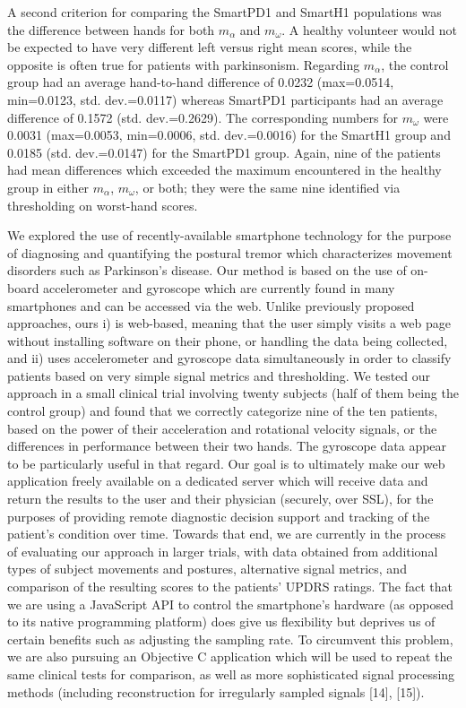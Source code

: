 A second criterion for comparing the \gls{SmartPD1} and \gls{SmartH1} populations was the difference between hands for both $m_{\alpha}$ and $m_{\omega}$. A healthy volunteer would not be expected to have very different left versus right mean scores, while the opposite is often true for patients with parkinsonism. Regarding $m_{\alpha}$, the control group had an average hand-to-hand difference of 0.0232 (max=0.0514, min=0.0123, std. dev.=0.0117) whereas \gls{SmartPD1} participants had an average difference of 0.1572 (std. dev.=0.2629). The corresponding numbers for $m_{\omega}$ were 0.0031 (max=0.0053, min=0.0006, std. dev.=0.0016) for the \gls{SmartH1} group and 0.0185 (std. dev.=0.0147) for the \gls{SmartPD1} group. Again, nine of the patients had mean differences which exceeded the maximum encountered in the healthy group in either $m_{\alpha}$, $m_{\omega}$, or both; they were the same nine identified via thresholding on worst-hand scores.


We explored the use of recently-available smartphone technology for the purpose of diagnosing and quantifying the postural tremor which characterizes movement disorders such as Parkinson’s disease. Our method is based on the use of on-board accelerometer and gyroscope which are currently found in many smartphones and can be accessed via the web. Unlike previously proposed approaches, ours i) is web-based, meaning that the user simply visits a web page without installing software on their phone, or handling the data being collected, and ii) uses accelerometer and gyroscope data simultaneously in order to classify patients based on very simple signal metrics and thresholding. 
We tested our approach in a small clinical trial involving twenty subjects (half of them being the control group) and found that we correctly categorize nine of the ten patients, based on the power of their acceleration and rotational velocity signals, or the differences in performance between their two hands. The gyroscope data appear to be particularly useful in that regard.
Our goal is to ultimately make our web application freely available on a dedicated server which will receive data and return the results to the user and their physician (securely, over SSL), for the purposes of providing remote diagnostic decision support and tracking of the patient’s condition over time. Towards that end, we are currently in the process of evaluating our approach in larger trials, with data obtained from additional types of subject movements and postures, alternative signal metrics, and comparison of the resulting scores to the patients’ UPDRS ratings. 
The fact that we are using a JavaScript API to control the smartphone’s hardware (as opposed to its native programming platform) does give us flexibility but deprives us of certain benefits such as adjusting the sampling rate. To circumvent this problem, we are also pursuing an Objective C application which will be used to repeat the same clinical tests for comparison, as well as more sophisticated signal processing methods (including reconstruction for irregularly sampled signals [14], [15]). 

